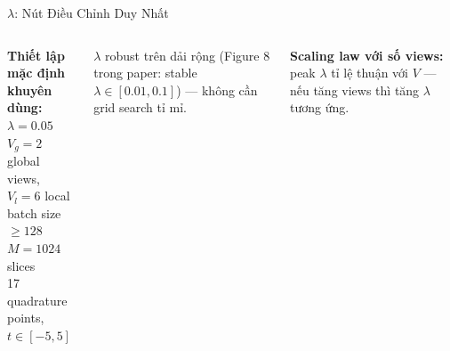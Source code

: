 \documentclass[aspectratio=169,9pt]{beamer}
\begin{document}
\begin{frame}{$\lambda$: Nút Điều Chỉnh Duy Nhất}
\begin{columns}[T]
\vspace{0.3em}

\begin{primarybox}
\footnotesize \textbf{Thiết lập mặc định khuyên dùng:}\\[3pt]
$\lambda = 0.05$\\
$V_g=2$ global views, $V_l=6$ local\\
batch size $\geq 128$\\
$M=1024$ slices\\
17 quadrature points, $t\in[-5,5]$
\end{primarybox}

\vspace{0.5em}
\begin{goodbox}
\footnotesize $\lambda$ robust trên dải rộng (Figure 8 trong paper: stable $\lambda\in[0.01, 0.1]$) — không cần grid search tỉ mỉ.
\end{goodbox}

\vspace{0.5em}
\textbf{Scaling law với số views:} peak $\lambda$ tỉ lệ thuận với $V$ — nếu tăng views thì tăng $\lambda$ tương ứng.

\end{columns}
\end{frame}
\end{document}
